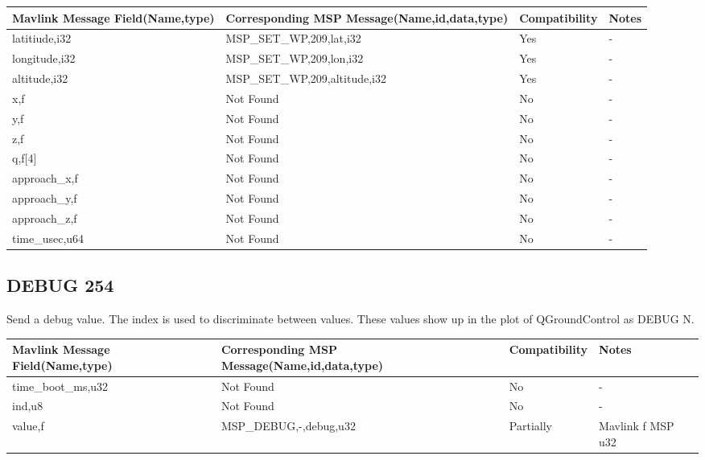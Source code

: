 {
\centering
\begin{tabular}{ |p{4cm  } |p{7cm} | p{2cm}|m{5em}|}
\hline
Mavlink Message Field(Name,type)&Corresponding MSP Message(Name,id,data,type)& Compatibility & Notes\\
\hline
\rowcolor{green}
latitiude,i32 & MSP\_SET\_WP,209,lat,i32& Yes & - \\
\hline
\rowcolor{green}
longitude,i32 & MSP\_SET\_WP,209,lon,i32 & Yes & - \\
\hline
\rowcolor{green}
altitude,i32 & MSP\_SET\_WP,209,altitude,i32 & Yes & - \\
\hline
x,f& Not Found & No & - \\
\hline
y,f& Not Found & No & - \\
\hline
z,f & Not Found & No & - \\
\hline
q,f[4] & Not Found & No & - \\
\hline
approach\_x,f & Not Found & No & - \\
\hline
approach\_y,f & Not Found & No & - \\
\hline
approach\_z,f & Not Found & No & - \\
\hline
time\_usec,u64 & Not Found & No & - \\
\end{tabular}
}

\cleardoublepage




\subsection{DEBUG 254 } 
Send a debug value. The index is used to discriminate between values. These values show up in the plot of QGroundControl as DEBUG N.\\

{
\centering
\begin{tabular}{ |p{4cm  } |p{7cm} | p{2cm}|m{5em}|}
\hline
Mavlink Message Field(Name,type)&Corresponding MSP Message(Name,id,data,type)& Compatibility & Notes\\

\hline
time\_boot\_ms,u32 & Not Found & No & - \\
\hline
ind,u8 & Not Found & No & - \\
\hline
\rowcolor{lightgray}
value,f & MSP\_DEBUG,-,debug,u32 & Partially & Mavlink f MSP u32 \\
\end{tabular}
}

